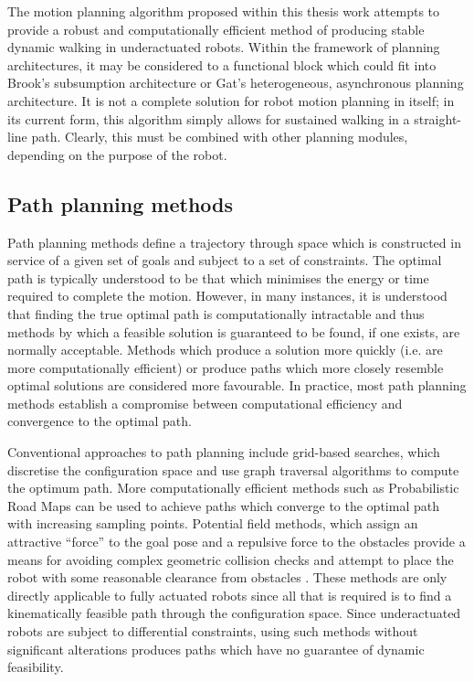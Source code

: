 The motion planning algorithm proposed within this thesis work attempts to provide a robust and computationally efficient method of producing stable dynamic walking in underactuated robots. Within the framework of planning architectures, it may be considered to a functional block which could fit into Brook's subsumption architecture or Gat's heterogeneous, asynchronous planning architecture. It is not a complete solution for robot motion planning in itself; in its current form, this algorithm simply allows for sustained walking in a straight-line path. Clearly, this must be combined with other planning modules, depending on the purpose of the robot.

\subsection{Path planning methods}
Path planning methods define a trajectory through space which is constructed in service of a given set of goals and subject to a set of constraints. The optimal path is typically understood to be that which minimises the energy or time required to complete the motion. However, in many instances, it is understood that finding the true optimal path is computationally intractable and thus methods by which a feasible solution is guaranteed to be found, if one exists, are normally acceptable. Methods which produce a solution more quickly (i.e. are more computationally efficient) or produce paths which more closely resemble optimal solutions are considered more favourable. In practice, most path planning methods establish a compromise between computational efficiency and convergence to the optimal path. 

Conventional approaches to path planning include grid-based searches, which discretise the configuration space and use graph traversal algorithms to compute the optimum path. More computationally efficient methods such as Probabilistic Road Maps \cite{boor1999gaussian} can be used to achieve paths which converge to the optimal path with increasing sampling points. Potential field methods, which assign an attractive ``force'' to the goal pose and a repulsive force to the obstacles provide a means for avoiding complex geometric collision checks and attempt to place the robot with some reasonable clearance from obstacles \cite{hwang1992potential}. These methods are only directly applicable to fully actuated robots since all that is required is to find a kinematically feasible path through the configuration space. Since underactuated robots are subject to differential constraints, using such methods without significant alterations produces paths which have no guarantee of dynamic feasibility. 

